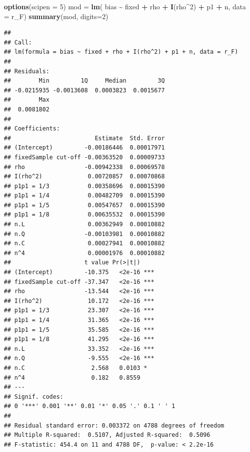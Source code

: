 \documentclass[
]{book}
\newenvironment{Shaded}{\begin{snugshade}}{\end{snugshade}}
\newcommand{\AttributeTok}[1]{\textcolor[rgb]{0.13,0.29,0.53}{#1}}
\newcommand{\DecValTok}[1]{\textcolor[rgb]{0.00,0.00,0.81}{#1}}
\newcommand{\FunctionTok}[1]{\textcolor[rgb]{0.13,0.29,0.53}{\textbf{#1}}}
\newcommand{\NormalTok}[1]{#1}
\newcommand{\OtherTok}[1]{\textcolor[rgb]{0.56,0.35,0.01}{#1}}
\newcommand{\SpecialCharTok}[1]{\textcolor[rgb]{0.81,0.36,0.00}{\textbf{#1}}}
\begin{document}
\begin{Shaded}
\begin{Highlighting}[]
\FunctionTok{options}\NormalTok{(}\AttributeTok{scipen =} \DecValTok{5}\NormalTok{)}
\NormalTok{mod }\OtherTok{=} \FunctionTok{lm}\NormalTok{( bias }\SpecialCharTok{\textasciitilde{}}\NormalTok{ fixed }\SpecialCharTok{+}\NormalTok{ rho }\SpecialCharTok{+} \FunctionTok{I}\NormalTok{(rho}\SpecialCharTok{\^{}}\DecValTok{2}\NormalTok{) }\SpecialCharTok{+}\NormalTok{ p1 }\SpecialCharTok{+}\NormalTok{ n, }\AttributeTok{data =}\NormalTok{ r\_F)}
\FunctionTok{summary}\NormalTok{(mod, }\AttributeTok{digits=}\DecValTok{2}\NormalTok{)}
\end{Highlighting}
\end{Shaded}

\begin{verbatim}
## 
## Call:
## lm(formula = bias ~ fixed + rho + I(rho^2) + p1 + n, data = r_F)
## 
## Residuals:
##        Min         1Q     Median         3Q 
## -0.0215935 -0.0013608  0.0003823  0.0015677 
##        Max 
##  0.0081802 
## 
## Coefficients:
##                        Estimate  Std. Error
## (Intercept)         -0.00186446  0.00017971
## fixedSample cut-off -0.00363520  0.00009733
## rho                 -0.00942338  0.00069578
## I(rho^2)             0.00720857  0.00070868
## p1p1 = 1/3           0.00358696  0.00015390
## p1p1 = 1/4           0.00482709  0.00015390
## p1p1 = 1/5           0.00547657  0.00015390
## p1p1 = 1/8           0.00635532  0.00015390
## n.L                  0.00362949  0.00010882
## n.Q                 -0.00103981  0.00010882
## n.C                  0.00027941  0.00010882
## n^4                  0.00001976  0.00010882
##                     t value Pr(>|t|)    
## (Intercept)         -10.375   <2e-16 ***
## fixedSample cut-off -37.347   <2e-16 ***
## rho                 -13.544   <2e-16 ***
## I(rho^2)             10.172   <2e-16 ***
## p1p1 = 1/3           23.307   <2e-16 ***
## p1p1 = 1/4           31.365   <2e-16 ***
## p1p1 = 1/5           35.585   <2e-16 ***
## p1p1 = 1/8           41.295   <2e-16 ***
## n.L                  33.352   <2e-16 ***
## n.Q                  -9.555   <2e-16 ***
## n.C                   2.568   0.0103 *  
## n^4                   0.182   0.8559    
## ---
## Signif. codes:  
## 0 '***' 0.001 '**' 0.01 '*' 0.05 '.' 0.1 ' ' 1
## 
## Residual standard error: 0.003372 on 4788 degrees of freedom
## Multiple R-squared:  0.5107, Adjusted R-squared:  0.5096 
## F-statistic: 454.4 on 11 and 4788 DF,  p-value: < 2.2e-16
\end{verbatim}
\end{document}

